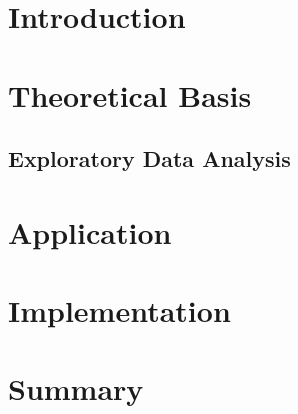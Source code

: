 \documentclass[a4paper, 12pt, oneside]{scrbook}
\begin{document}
	\frontmatter
	
	
	\tableofcontents
	\listoffigures
	\nocite{*}

	\mainmatter

	\pagebreak
	\chapter{Introduction} 
	
	\chapter{Theoretical Basis}
	
	\section{Exploratory Data Analysis}
	
	\chapter{Application}
	
	
	\chapter{Implementation}
	
	
	\chapter{Summary} %
	
	\frontmatter
	\printbibliography
\end{document}
